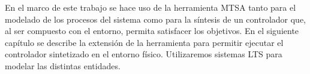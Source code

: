 En el marco de este trabajo se hace uso de la herramienta MTSA tanto para el modelado de los procesos del sistema como
para la síntesis de un controlador que, al ser compuesto con el entorno, permita satisfacer los objetivos. En el
siguiente capítulo se describe la extensión de la herramienta para permitir ejecutar el controlador sintetizado en el
entorno físico. Utilizaremos sistemas LTS para modelar las distintas entidades.
